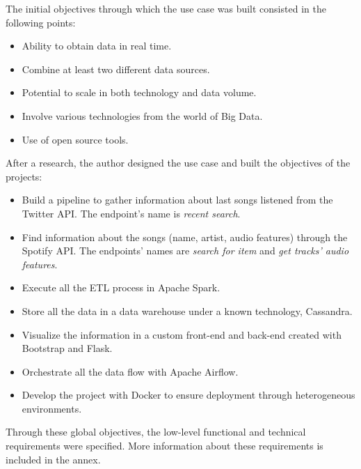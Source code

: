 

\nonzeroparskip The initial objectives through which the use case was built consisted in the following points:
\begin{itemize}
	\item Ability to obtain data in real time.
	\item Combine at least two different data sources.
	\item Potential to scale in both technology and data volume.
	\item Involve various technologies from the world of Big Data.
	\item Use of open source tools.
\end{itemize}

\nonzeroparskip After a research, the author designed the use case and built the objectives of the projects:
\begin{itemize}
	\item Build a pipeline to gather information about last songs listened from the Twitter API. The endpoint's name is \textit{recent search}.
	\item Find information about the songs (name, artist, audio features) through the Spotify API. The endpoints' names are \textit{search for item} and \textit{get tracks' audio features}.
	\item Execute all the ETL process in Apache Spark.
	\item Store all the data in a data warehouse under a known technology, Cassandra.
	\item Visualize the information in a custom front-end and back-end created with Bootstrap and Flask.
	\item Orchestrate all the data flow with Apache Airflow.
	\item Develop the project with Docker to ensure deployment through heterogeneous environments.
\end{itemize}

\nonzeroparskip Through these global objectives, the low-level functional and technical requirements were specified. More information about these requirements is included in the annex.